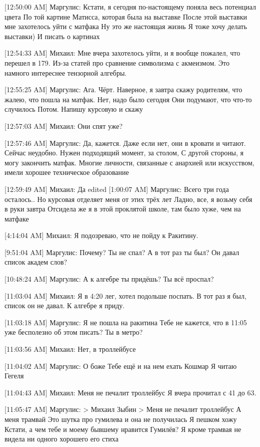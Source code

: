 \documentclass{article}
\begin{document}
{[12:50:00 AM] Маргулис:
Кстати, я сегодня по-настоящему поняла весь потенциал цвета
 По той картине Матисса, которая была на выставке
 После этой выставки мне захотелось уйти с матфака
 Ну это же настоящая жизнь
 Я тоже хочу делать выставки)
 И писать о картинах

[12:54:33 AM] Михаил:
Мне вчера захотелось уйти, и я вообще пожалел, что перешел в 179. Из-за статей про сравнение символизма с акмеизмом. Это намного интереснее тензорной алгебры.

[12:55:25 AM] Маргулис:
Ага.
 Чёрт.
 Наверное, я завтра скажу родителям, что жалею, что пошла на матфак.
 Нет, надо было сегодня
 Они подумают, что что-то случилось
 Потом. Напишу курсовую и скажу

[12:57:03 AM] Михаил:
Они спят уже?

[12:57:46 AM] Маргулис:
Да, кажется. Даже если нет, они в кровати и читают. Сейчас неудобно. Нужен подходящий момент, за столом,
 С другой стороны, я могу закончить матфак. Многие личности, связанные с анархией или искусством, имели хорошее техническое образование

[12:59:49 AM] Михаил:
Да
edited 
[1:00:07 AM] Маргулис:
Всего три года осталось..
Но курсовая отделяет меня от этих трёх лет
 Ладно, все, я возьму себя в руки завтра
 Отсидела же я в этой проклятой школе, там было хуже, чем на матфаке

[4:14:04 AM] Михаил:
Я подозреваю, что не пойду к Ракитину.

[9:51:04 AM] Маргулис:
Почему? Ты не спал?
 А в тот раз ты был? Он давал список академ слов?

[10:48:24 AM] Маргулис:
А к алгебре ты придёшь?
 Ты всё проспал?

[11:03:04 AM] Михаил:
Я в 4:20 лег, хотел подольше поспать. В тот раз я был, список он не давал. К алгебре я приду.

[11:03:18 AM] Маргулис:
Я не пошла на ракитина
 Тебе не кажется, что в 11:05 уже бесполезно об этом писать?
 Ты в метро?

[11:03:56 AM] Михаил:
Нет, в троллейбусе

[11:04:02 AM] Маргулис:
О боже
 Тебе ещё и на нем ехать
 Кошмар
 Я читаю Гегеля

[11:04:43 AM] Михаил:
Меня не печалит троллейбус
 Я вчера прочитал с 41 до 63.

[11:05:47 AM] Маргулис:
> Михаил Зыбин
> Меня не печалит троллейбус
А меня трамвай
 Это шутка про гумилева и она не получилась
 Я пешком хожу
 Кстати, а чем тебе и моему бывшему нравится Гумилёв?
 Я кроме трамвая не видела ни одного хорошего его стиха

}
\end{document}
